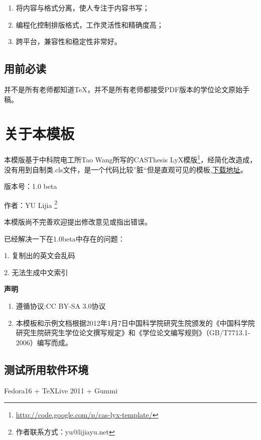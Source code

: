 \documentclass[a4paper,12pt,oneside,openany]{book}
\begin{document}
\begin{enumerate}
\item 将内容与格式分离，使人专注于内容书写；
\item 编程化控制排版格式，工作灵活性和精确度高；
\item 跨平台，兼容性和稳定性非常好。
\end{enumerate}

\section{用前必读}

并不是所有老师都知道\TeX，并不是所有老师都接受PDF版本的学位论文原始手稿。

\chapter{关于本模板}
本模版基于中科院电工所Tao Wang所写的CASThesis LyX模版\footnote{\href{http://code.google.com/p/cas-lyx-template/}{http://code.google.com/p/cas-lyx-template/}}，经简化改造成，没有用到自制类.cls文件，是一个代码比较”脏“但是直观可见的模板,\href{http://github.com/yulijia/LaTeX_UCASthesis}{下载地址}。

版本号：1.0 beta%

作者：YU Lijia%
\footnote{作者联系方式：yu@lijiayu.net%
}

本模版尚不完善欢迎提出修改意见或指出错误。

已经解决一下在1.0beta中存在的问题：

1. 复制出的英文会乱码

2. 无法生成中文索引

\begin{center}
\textbf{声明}
\par\end{center}
\begin{enumerate}
\item 遵循协议:CC BY-SA 3.0协议
\item 本模板和示例文档根据2012年1月7日中国科学院研究生院颁发的《中国科学院研究生院研究生学位论文撰写规定》和《学位论文编写规则》（GB/T7713.1-2006）编写而成。
\end{enumerate}

\section{测试所用软件环境}

Fedora16 + \TeX Live 2011 +  Gummi
\end{document}
